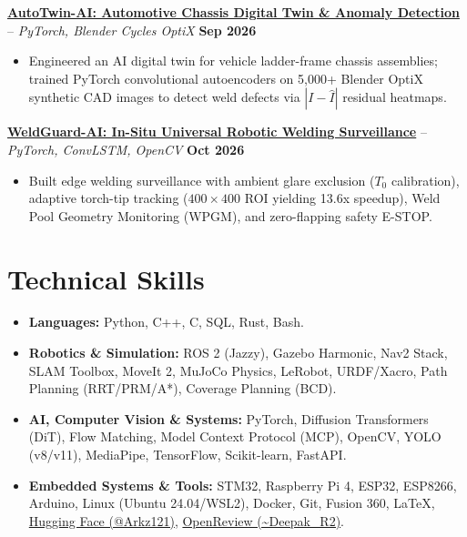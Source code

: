 \documentclass[letterpaper,10pt]{article}
\begin{document}
\noindent
\href{https://github.com/Arkz-Deepak/AutoTwin-AI}{\textbf{AutoTwin-AI: Automotive Chassis Digital Twin \& Anomaly Detection}} -- \textit{PyTorch, Blender Cycles OptiX} \hfill \textbf{Sep 2026} \\
\begin{itemize}
    \item Engineered an AI digital twin for vehicle ladder-frame chassis assemblies; trained PyTorch convolutional autoencoders on 5,000+ Blender OptiX synthetic CAD images to detect weld defects via $|I - \hat{I}|$ residual heatmaps.
\end{itemize}
\vspace{3pt}

\noindent
\href{https://github.com/Arkz-Deepak/WeldGuard-AI}{\textbf{WeldGuard-AI: In-Situ Universal Robotic Welding Surveillance}} -- \textit{PyTorch, ConvLSTM, OpenCV} \hfill \textbf{Oct 2026} \\
\begin{itemize}
    \item Built edge welding surveillance with ambient glare exclusion ($T_0$ calibration), adaptive torch-tip tracking ($400\times400$ ROI yielding 13.6x speedup), Weld Pool Geometry Monitoring (WPGM), and zero-flapping safety E-STOP.
\end{itemize}

\section{Technical Skills}
\begin{itemize}
    \item \textbf{Languages:} Python, C++, C, SQL, Rust, Bash.
    \item \textbf{Robotics \& Simulation:} ROS 2 (Jazzy), Gazebo Harmonic, Nav2 Stack, SLAM Toolbox, MoveIt 2, MuJoCo Physics, LeRobot, URDF/Xacro, Path Planning (RRT/PRM/A*), Coverage Planning (BCD).
    \item \textbf{AI, Computer Vision \& Systems:} PyTorch, Diffusion Transformers (DiT), Flow Matching, Model Context Protocol (MCP), OpenCV, YOLO (v8/v11), MediaPipe, TensorFlow, Scikit-learn, FastAPI.
    \item \textbf{Embedded Systems \& Tools:} STM32, Raspberry Pi 4, ESP32, ESP8266, Arduino, Linux (Ubuntu 24.04/WSL2), Docker, Git, Fusion 360, \LaTeX, \href{https://huggingface.co/Arkz121}{Hugging Face (@Arkz121)}, \href{https://openreview.net/profile?id=~Deepak_R2}{OpenReview (\textasciitilde Deepak\_R2)}.
\end{itemize}
\end{document}
